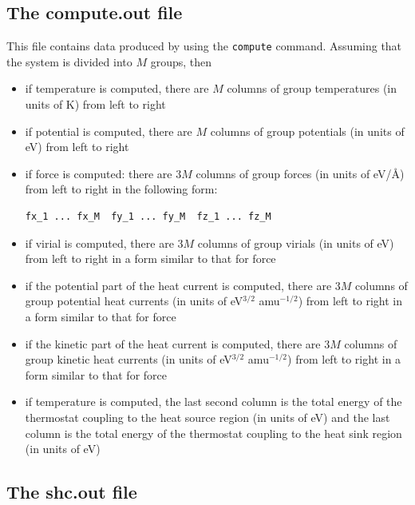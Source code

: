 \documentclass[12pt,a4paper]{report}
\begin{document}
\subsection{The compute.out file}

This file contains data produced by using the \verb"compute" command. Assuming that the system is divided into $M$ groups, then

\begin{itemize}

\item if temperature is computed, there are $M$ columns of group temperatures (in units of K) from left to right


\item if potential is computed, there are $M$ columns of group potentials (in units of eV) from left to right

\item if force is computed: there are $3M$ columns of group forces (in units of eV/\AA) from left to right in the following form:
\begin{verbatim}
fx_1 ... fx_M  fy_1 ... fy_M  fz_1 ... fz_M
\end{verbatim}

\item if virial is computed, there are $3M$ columns of group virials (in units of eV) from left to right in a form similar to that for force

\item if the potential part of the heat current is computed, there are $3M$ columns of group potential heat currents (in units of eV$^{3/2}$ amu$^{-1/2}$) from left to right in a form similar to that for force

\item if the kinetic part of the heat current is computed, there are $3M$ columns of group kinetic heat currents (in units of eV$^{3/2}$ amu$^{-1/2}$) from left to right in a form similar to that for force

\item if temperature is computed, the last second column is the total energy of the thermostat coupling to the heat source region (in units of eV) and the last column is the total energy of the thermostat coupling to the heat sink region (in units of eV)

\end{itemize}


\subsection{The shc.out file}
\end{document}
